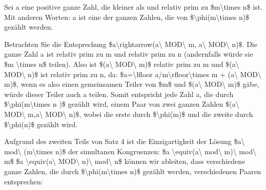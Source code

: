 \documentclass[a4paper]{article}
\begin{document}
\begin{multicols}{3}
\begin{itemize*}
\begin{itemize*}
                  \begin{itemize*} \item Sei a eine positive ganze Zahl, die kleiner als und relativ prim zu \$m\textbackslash times n\$ ist. Mit anderen Worten: a ist eine der ganzen Zahlen, die von \$\textbackslash phi(m\textbackslash times n)\$ gezählt werden. \item Betrachten Sie die Entsprechung \$a\textbackslash rightarrow(a\textbackslash{} MOD\textbackslash{} m, a\textbackslash{} MOD\textbackslash{} n)\$. Die ganze Zahl a ist relativ prim zu m und relativ prim zu n (andernfalls würde sie \$m \textbackslash times n\$ teilen). Also ist \$(a\textbackslash{} MOD\textbackslash{} m)\$ relativ prim zu m und \$(a\textbackslash{} MOD\textbackslash{} n)\$ ist relativ prim zu n, da: \$a=\textbackslash lfloor a/m\textbackslash rfloor\textbackslash times m + (a\textbackslash{} MOD\textbackslash{} m)\$, wenn es also einen gemeinsamen Teiler von \$m\$ und \$(a\textbackslash{} MOD\textbackslash{} m)\$ gäbe, würde dieser Teiler auch a teilen. Somit entspricht jede Zahl a, die durch \$\textbackslash phi(m\textbackslash times n )\$ gezählt wird, einem Paar von zwei ganzen Zahlen \$(a\textbackslash{} MOD\textbackslash{} m,a\textbackslash{} MOD\textbackslash{} n)\$, wobei die erste durch \$\textbackslash phi(m)\$ und die zweite durch \$\textbackslash phi(n)\$ gezählt wird. \item Aufgrund des zweiten Teils von Satz 4 ist die Einzigartigkeit der Lösung \$a\textbackslash{} mod\textbackslash{} (m\textbackslash times n)\$ der simultanen Kongruenzen: \$a \textbackslash equiv(a\textbackslash{} mod\textbackslash{} m)\textbackslash{} mod\textbackslash{} m\$ \$a \textbackslash equiv(a\textbackslash{} MOD\textbackslash{} n)\textbackslash{} mod\textbackslash{} n\$ können wir ableiten, dass verschiedene ganze Zahlen, die durch \$\textbackslash phi(m\textbackslash times n)\$ gezählt werden, verschiedenen Paaren entsprechen:

\end{itemize*}
\end{itemize*}
\end{itemize*}
\end{multicols}
\end{document}
